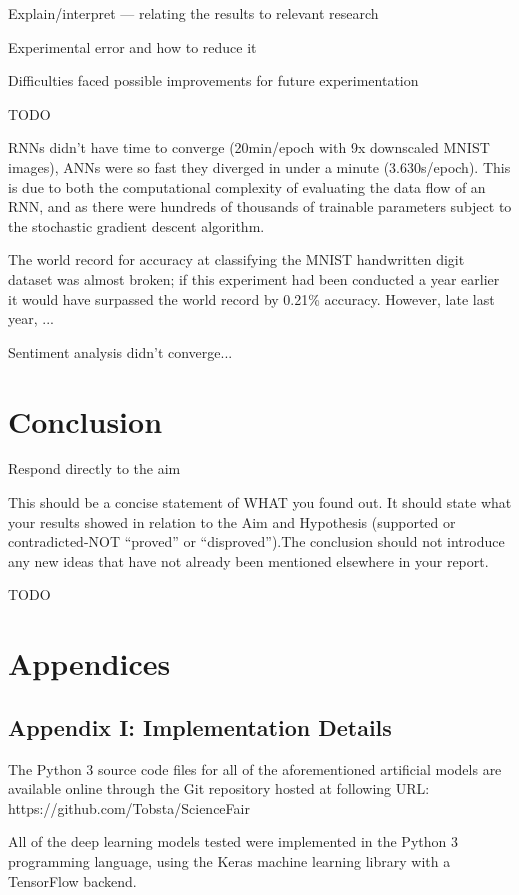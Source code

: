 \documentclass[]{report}
\begin{document}
Explain/interpret --- relating the results to relevant research

Experimental error and how to reduce it

Difficulties faced possible improvements for future experimentation

TODO

RNNs didn't have time to converge (20min/epoch with 9x downscaled MNIST images), ANNs were so fast they diverged in under a minute (3.630s/epoch). This is due to both the computational complexity of evaluating the data flow of an RNN, and as there were hundreds of thousands of trainable parameters subject to the stochastic gradient descent algorithm.

The world record for accuracy at classifying the MNIST handwritten digit dataset was almost broken; if this experiment had been conducted a year earlier it would have surpassed the world record by 0.21\% accuracy. However, late last year, ...

Sentiment analysis didn't converge...

\section{Conclusion}

Respond directly to the aim

This should be a concise statement of WHAT you found out. It should state what your results showed in relation to the Aim and Hypothesis (supported or contradicted-NOT “proved” or “disproved”).The conclusion should not introduce any new ideas that have not already been mentioned elsewhere in your report.

TODO

\section{Appendices}

\subsection{Appendix I: Implementation Details}

The Python 3 source code files for all of the aforementioned artificial models are available online through the Git repository hosted at following URL: https://github.com/Tobsta/ScienceFair

All of the deep learning models tested were implemented in the Python 3 programming language, using the Keras machine learning library with a TensorFlow backend.
\end{document}
